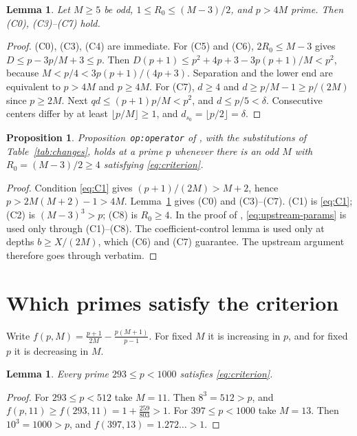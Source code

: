 \documentclass[11pt]{amsart}
\numberwithin{equation}{section}
\newtheorem{lemma}[theorem]{Lemma}
\newtheorem{proposition}[theorem]{Proposition}
\theoremstyle{definition}
\theoremstyle{remark}
\newcommand{\up}[1]{\texttt{#1}}
\begin{document}
\begin{lemma}\label{lem:auto}
Let $M\ge5$ be odd, $1\le R_0\le(M-3)/2$, and $p>4M$ prime. Then
\textup{(C0)}, \textup{(C3)}--\textup{(C7)} hold.
\end{lemma}

\begin{proof}
(C0), (C3), (C4) are immediate. For (C5) and (C6), $2R_0\le M-3$ gives
$D\le p-3p/M+3\le p$. Then $D(p+1)\le p^2+4p+3-3p(p+1)/M<p^2$, because
$M<p/4<3p(p+1)/(4p+3)$. Separation and the lower end are equivalent
to $p>4M$ and $p\ge4M$. For (C7), $d\ge4$ and $d\ge p/M-1\ge p/(2M)$
since $p\ge2M$. Next $qd\le(p+1)p/M<p^2$, and $d\le p/5<\delta$.
Consecutive centers differ by at least $\lfloor p/M\rfloor\ge1$, and
$d_{s_0}=\lfloor p/2\rfloor=\delta$.
\end{proof}

\begin{proposition}\label{prop:reduce}
Proposition~\up{op:operator} of \cite{OAI-HW2}, with the substitutions
of Table~\ref{tab:changes}, holds at a prime $p$ whenever there is an
odd $M$ with $R_0=(M-3)/2\ge4$ satisfying \eqref{eq:criterion}.
\end{proposition}

\begin{proof}
Condition \eqref{eq:C1} gives $(p+1)/(2M)>M+2$, hence $p>2M(M+2)-1>4M$.
Lemma~\ref{lem:auto} gives (C0) and (C3)--(C7). (C1) is
\eqref{eq:C1}; (C2) is $(M-3)^3>p$; (C8) is $R_0\ge4$. In the proof
of \cite[Prop.~\up{op:operator}]{OAI-HW2}, \eqref{eq:upstream-params}
is used only through (C1)--(C8). The coefficient-control lemma is used
only at depths $b\ge X/(2M)$, which (C6) and (C7) guarantee. The
upstream argument therefore goes through verbatim.
\end{proof}

\section{Which primes satisfy the criterion}

Write $f(p,M)=\frac{p+1}{2M}-\frac{p(M+1)}{p-1}$. For fixed $M$ it is
increasing in $p$, and for fixed $p$ it is decreasing in $M$.

\begin{lemma}\label{lem:small}
Every prime $293\le p<1000$ satisfies \eqref{eq:criterion}.
\end{lemma}

\begin{proof}
For $293\le p<512$ take $M=11$. Then $8^3=512>p$, and
$f(p,11)\ge f(293,11)=1+\tfrac{259}{803}>1$. For $397\le p<1000$ take
$M=13$. Then $10^3=1000>p$, and $f(397,13)=1.272\ldots>1$.
\end{proof}
\end{document}
